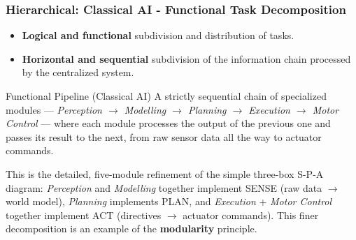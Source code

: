\subsubsection{ Hierarchical: Classical AI - Functional Task Decomposition}

\begin{itemize}
    \item \textbf{Logical and functional} subdivision and distribution of tasks.
    \item \textbf{Horizontal and sequential} subdivision of the information chain processed by the centralized system.
\end{itemize}

\begin{center}
\end{center}

\begin{defbox}{Functional Pipeline (Classical AI)}
A strictly sequential chain of specialized modules --- \textit{Perception $\rightarrow$ Modelling $\rightarrow$ Planning $\rightarrow$ Execution $\rightarrow$ Motor Control} --- where each module processes the output of the previous one and passes its result to the next, from raw sensor data all the way to actuator commands.
\end{defbox}

 This is the detailed, five-module refinement of the simple three-box S-P-A diagram: \textit{Perception} and \textit{Modelling} together implement SENSE (raw data $\rightarrow$ world model), \textit{Planning} implements PLAN, and \textit{Execution} + \textit{Motor Control} together implement ACT (directives $\rightarrow$ actuator commands). This finer decomposition is an example of the \textbf{modularity} principle.


